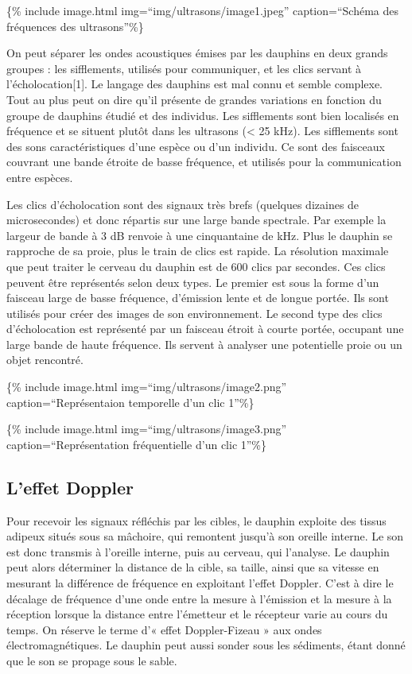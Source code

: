 \{\% include image.html img=``img/ultrasons/image1.jpeg''
caption=``Schéma des fréquences des ultrasons''\%\}

On peut séparer les ondes acoustiques émises par les dauphins en deux
grands groupes : les sifflements, utilisés pour communiquer, et les
clics servant à l'écholocation{[}1{]}. Le langage des dauphins est mal
connu et semble complexe. Tout au plus peut on dire qu'il présente de
grandes variations en fonction du groupe de dauphins étudié et des
individus. Les sifflements sont bien localisés en fréquence et se
situent plutôt dans les ultrasons (\textless{} 25 kHz). Les sifflements
sont des sons caractéristiques d'une espèce ou d'un individu. Ce sont
des faisceaux couvrant une bande étroite de basse fréquence, et utilisés
pour la communication entre espèces.

Les clics d'écholocation sont des signaux très brefs (quelques dizaines
de microsecondes) et donc répartis sur une large bande spectrale. Par
exemple la largeur de bande à 3 dB renvoie à une cinquantaine de kHz.
Plus le dauphin se rapproche de sa proie, plus le train de clics est
rapide. La résolution maximale que peut traiter le cerveau du dauphin
est de 600 clics par secondes. Ces clics peuvent être représentés selon
deux types. Le premier est sous la forme d'un faisceau large de basse
fréquence, d'émission lente et de longue portée. Ils sont utilisés pour
créer des images de son environnement. Le second type des clics
d'écholocation est représenté par un faisceau étroit à courte portée,
occupant une large bande de haute fréquence. Ils servent à analyser une
potentielle proie ou un objet rencontré.

\{\% include image.html img=``img/ultrasons/image2.png''
caption=``Représentaion temporelle d'un clic 1''\%\}

\{\% include image.html img=``img/ultrasons/image3.png''
caption=``Représentation fréquentielle d'un clic 1''\%\}

\subsection{L'effet Doppler}\label{leffet-doppler}

Pour recevoir les signaux réfléchis par les cibles, le dauphin exploite
des tissus adipeux situés sous sa mâchoire, qui remontent jusqu'à son
oreille interne. Le son est donc transmis à l'oreille interne, puis au
cerveau, qui l'analyse. Le dauphin peut alors déterminer la distance de
la cible, sa taille, ainsi que sa vitesse en mesurant la différence de
fréquence en exploitant l'effet Doppler. C'est à dire le décalage de
fréquence d'une onde entre la mesure à l'émission et la mesure à la
réception lorsque la distance entre l'émetteur et le récepteur varie au
cours du temps. On réserve le terme d'« effet Doppler-Fizeau » aux ondes
électromagnétiques. Le dauphin peut aussi sonder sous les sédiments,
étant donné que le son se propage sous le sable.

